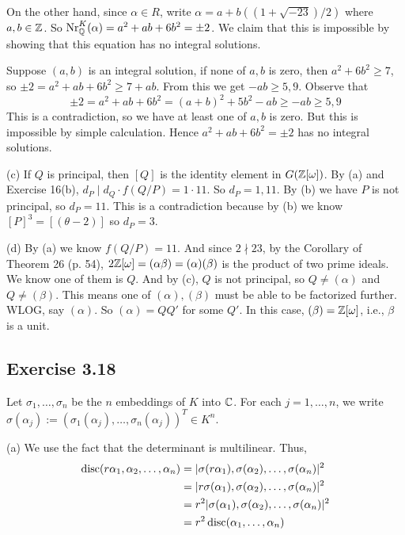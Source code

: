 \documentclass[../Marcus.tex]{subfiles}
\begin{document}
On the other hand, since $\alpha\in R$, write $\alpha=a+b((1+\sqrt{-23})/2)$ where $a,b\in\mathbb{Z}$. So $\operatorname{Nr}^K_{\mathbb{Q}}(\alpha)=a^2+ab+6b^2=\pm 2$. We claim that this is impossible by showing that this equation has no integral solutions.

Suppose $(a,b)$ is an integral solution, if none of $a,b$ is zero, then $a^2+6b^2\geq 7$, so $\pm2 = a^2+ab+6b^2 \geq 7+ab$. From this we get $-ab\geq 5,9$. Observe that $$\pm2 = a^2+ab+6b^2 = (a+b)^2+5b^2-ab \geq -ab \geq 5,9$$
This is a contradiction, so we have at least one of $a,b$ is zero. But this is impossible by simple calculation. Hence $a^2+ab+6b^2=\pm2$ has no integral solutions.

(c) If $Q$ is principal, then $[Q]$ is the identity element in $G(\mathbb{Z}[\omega])$. By (a) and Exercise 16(b), $d_P\mid d_Q\cdot f(Q/P)=1\cdot 11$. So $d_P=1,11$. By (b) we have $P$ is not principal, so $d_P=11$. This is a contradiction because by (b) we know $[P]^3=[(\theta-2)]$ so $d_P=3$.

(d) By (a) we know $f(Q/P)=11$. And since $2\nmid 23$, by the Corollary of Theorem 26 (p. 54), $2\mathbb{Z}[\omega]=(\alpha\beta)=(\alpha)(\beta)$ is the product of two prime ideals. We know one of them is $Q$. And by (c), $Q$ is not principal, so $Q\neq (\alpha)$ and $Q\neq(\beta)$. This means one of $(\alpha),(\beta)$ must be able to be factorized further. WLOG, say $(\alpha)$. So $(\alpha)=QQ'$ for some $Q'$. In this case, $(\beta)=\mathbb{Z}[\omega]$, i.e., $\beta$ is a unit.

\subsection*{Exercise 3.18}

Let $\sigma_1,\ldots,\sigma_n$ be the $n$ embeddings of $K$ into $\mathbb{C}$. For each $j=1,\ldots,n$, we write $\sigma(\alpha_j):=(\sigma_1(\alpha_j),\ldots,\sigma_n(\alpha_j))^T\in K^n$.

(a) We use the fact that the determinant is multilinear. Thus,
\begin{align*}
    \operatorname{disc}(r\alpha_1,\alpha_2,\ldots,\alpha_n) &= |\sigma(r\alpha_1),\sigma(\alpha_2),\ldots,\sigma(\alpha_n)|^2 \\
    &= |r\sigma(\alpha_1),\sigma(\alpha_2),\ldots,\sigma(\alpha_n)|^2 \\
    &= r^2|\sigma(\alpha_1),\sigma(\alpha_2),\ldots,\sigma(\alpha_n)|^2 \\
    &= r^2\operatorname{disc}(\alpha_1,\ldots,\alpha_n)
\end{align*}
\end{document}

